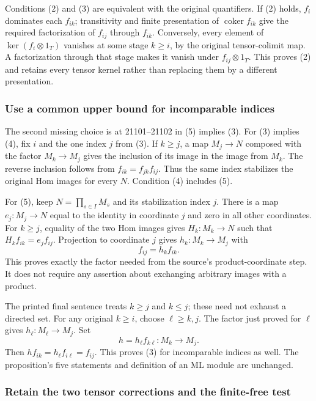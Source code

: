 Conditions (2) and (3) are equivalent with the original quantifiers. If (2) holds, \(f_i\) dominates each \(f_{ik}\); transitivity and finite presentation of \(\operatorname{coker}f_{ik}\) give the required factorization of \(f_{ij}\) through \(f_{ik}\). Conversely, every element of \(\ker(f_i\otimes1_T)\) vanishes at some stage \(k\geq i\), by the original tensor-colimit map. A factorization through that stage makes it vanish under \(f_{ij}\otimes1_T\). This proves (2) and retains every tensor kernel rather than replacing them by a different presentation.

\subsubsection{Use a common upper bound for incomparable indices}\label{algebra-proof-012-use-a-common-upper-bound-for-incomparable-indices}

The second missing choice is at 21101--21102 in (5) implies (3). For (3) implies (4), fix \(i\) and the one index \(j\) from (3). If \(k\geq j\), a map \(M_j\to N\) composed with the factor \(M_k\to M_j\) gives the inclusion of its image in the image from \(M_k\). The reverse inclusion follows from \(f_{ik}=f_{jk}f_{ij}\). Thus the same index stabilizes the original Hom images for every \(N\). Condition (4) includes (5).

For (5), keep \(N=\prod_{s\in I}M_s\) and its stabilization index \(j\). There is a map \(e_j:M_j\to N\) equal to the identity in coordinate \(j\) and zero in all other coordinates. For \(k\geq j\), equality of the two Hom images gives \(H_k:M_k\to N\) such that \(H_k f_{ik}=e_j f_{ij}\). Projection to coordinate \(j\) gives \(h_k:M_k\to M_j\) with \[
f_{ij}=h_k f_{ik}.
\] This proves exactly the factor needed from the source's product-coordinate step. It does not require any assertion about exchanging arbitrary images with a product.

The printed final sentence treats \(k\geq j\) and \(k\leq j\); these need not exhaust a directed set. For any original \(k\geq i\), choose \(\ell\geq k,j\). The factor just proved for \(\ell\) gives \(h_\ell:M_\ell\to M_j\). Set \[
h=h_\ell f_{k\ell}:M_k\to M_j.
\] Then \(h f_{ik}=h_\ell f_{i\ell}=f_{ij}\). This proves (3) for incomparable indices as well. The proposition's five statements and definition of an ML module are unchanged.

\subsubsection{Retain the two tensor corrections and the finite-free test}\label{algebra-proof-012-retain-the-two-tensor-corrections-and-the-finite-free-test}

